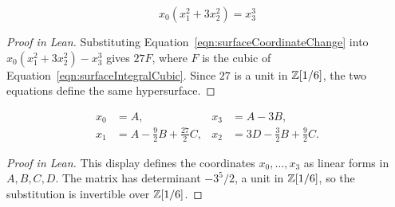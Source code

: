 \begin{equationnode}

\label{eqn:surfaceNormCubic}


\leanok



\begin{equation*} x_0(x_1^2+3x_2^2)=x_3^3 \end{equation*}

\end{equationnode}

\begin{proof}[Proof in Lean]

\leanok

Substituting Equation~\ref{eqn:surfaceCoordinateChange} into $x_0(x_1^2+3x_2^2)-x_3^3$ gives $27F$, where $F$ is the cubic of Equation~\ref{eqn:surfaceIntegralCubic}. Since $27$ is a unit in $\mathbb{Z}[1/6]$, the two equations define the same hypersurface.

\end{proof}

\begin{equationnode}

\label{eqn:surfaceCoordinateChange}


\leanok



\begin{equation*} \begin{aligned} x_0&=A,& x_3&=A-3B,\\ x_1&=A-\tfrac92B+\tfrac{27}{2}C,& x_2&=3D-\tfrac32B+\tfrac92C. \end{aligned} \end{equation*}

\end{equationnode}

\begin{proof}[Proof in Lean]

\leanok

This display defines the coordinates $x_0,\dots,x_3$ as linear forms in $A,B,C,D$. The matrix has determinant $-3^5/2$, a unit in $\mathbb{Z}[1/6]$, so the substitution is invertible over $\mathbb{Z}[1/6]$.

\end{proof}

